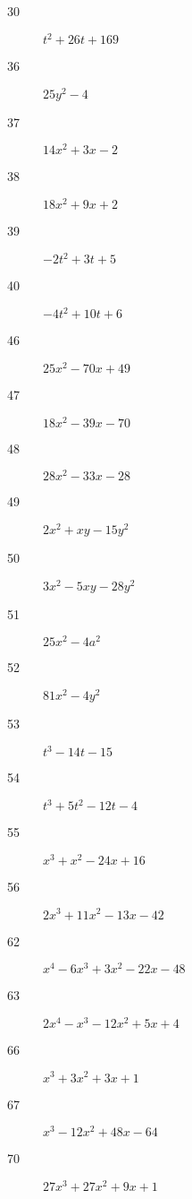 \documentclass[letterpaper]{exam}
\begin{document}
\begin{description}
      \item[30] $t^2 + 26t + 169$

      \item[36] $25y^2 - 4$

      \item[37] $14x^2 + 3x - 2$

      \item[38] $18x^2 + 9x + 2$

      \item[39] $-2t^2 +3t + 5$

      \item[40] $-4t^2 + 10t + 6$

      \item[46] $25x^2 - 70x + 49$

      \item[47] $18 x^2 - 39 x - 70$

      \item[48] $28 x^2 - 33 x - 28$

      \item[49] $2 x^2 + x y - 15 y^2$

      \item[50] $3 x^2 - 5 x y - 28 y^2$

      \item[51] $25x^2 - 4a^2$

      \item[52] $81x^2 - 4y^2$

      \item[53] $t^3 - 14t - 15$

      \item[54] $t^3 + 5t^2 - 12t - 4$

      \item[55] $x^3 + x^2 - 24x + 16$

      \item[56] $2x^3 + 11x^2 - 13x - 42$

      \item[62] $x^4 - 6x^3 + 3x^2 - 22x - 48$

      \item[63] $2x^4 - x^3 - 12x^2 + 5x + 4$

      \item[66] $x^3 + 3 x^2 + 3 x + 1$

      \item[67] $x^3 - 12 x^2 + 48 x - 64$

      \item[70] $27 x^3 + 27 x^2 + 9 x + 1$


\end{description}
\end{document}
